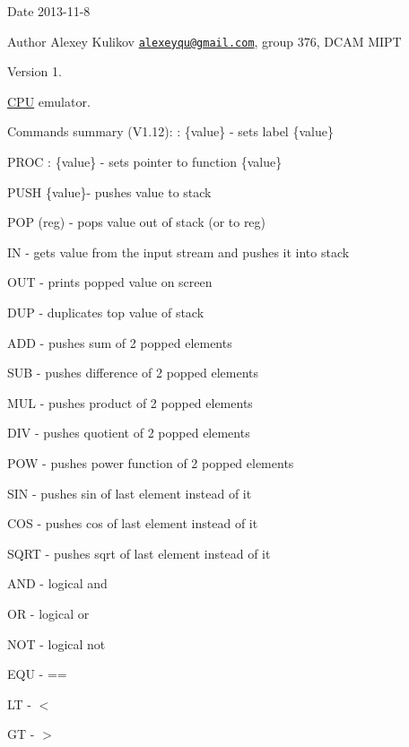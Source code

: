 \begin{DoxyDate}{Date}
2013-\/11-\/8 
\end{DoxyDate}
\begin{DoxyAuthor}{Author}
Alexey Kulikov \href{mailto:alexeyqu@gmail.com}{\tt alexeyqu@gmail.\-com}, group 376, D\-C\-A\-M M\-I\-P\-T 
\end{DoxyAuthor}
\begin{DoxyVersion}{Version}
1.
\end{DoxyVersion}
\hyperlink{structCPU}{C\-P\-U} emulator.

\begin{DoxyParagraph}{Commands summary (V1.12)\-:}
\-: \{value\} -\/ sets label \{value\}\par
 P\-R\-O\-C \-: \{value\} -\/ sets pointer to function \{value\}\par
 P\-U\-S\-H \{value\}-\/ pushes value to stack\par
 P\-O\-P (reg) -\/ pops value out of stack (or to reg)\par
 I\-N -\/ gets value from the input stream and pushes it into stack\par
 O\-U\-T -\/ prints popped value on screen\par
 D\-U\-P -\/ duplicates top value of stack\par
\par
 A\-D\-D -\/ pushes sum of 2 popped elements\par
 S\-U\-B -\/ pushes difference of 2 popped elements\par
 M\-U\-L -\/ pushes product of 2 popped elements\par
 D\-I\-V -\/ pushes quotient of 2 popped elements\par
 P\-O\-W -\/ pushes power function of 2 popped elements\par
 S\-I\-N -\/ pushes sin of last element instead of it\par
 C\-O\-S -\/ pushes cos of last element instead of it\par
 S\-Q\-R\-T -\/ pushes sqrt of last element instead of it\par
\par
 A\-N\-D -\/ logical and\par
 O\-R -\/ logical or\par
 N\-O\-T -\/ logical not\par
\par
 E\-Q\-U -\/ ==\par
 L\-T -\/ $<$\par
 G\-T -\/ $>$\par

\end{DoxyParagraph}
